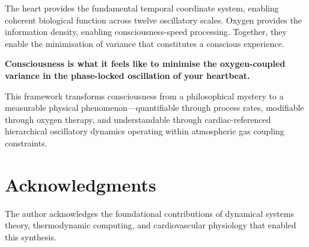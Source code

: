 \documentclass[12pt]{article}
\theoremstyle{remark}
\begin{document}
The heart provides the fundamental temporal coordinate system, enabling coherent biological function across twelve oscillatory scales. Oxygen provides the information density, enabling consciousness-speed processing. Together, they enable the minimisation of variance that constitutes a conscious experience.

\textbf{Consciousness is what it feels like to minimise the oxygen-coupled variance in the phase-locked oscillation of your heartbeat.}

This framework transforms consciousness from a philosophical mystery to a measurable physical phenomenon—quantifiable through process rates, modifiable through oxygen therapy, and understandable through cardiac-referenced hierarchical oscillatory dynamics operating within atmospheric gas coupling constraints.

\section*{Acknowledgments}

The author acknowledges the foundational contributions of dynamical systems theory, thermodynamic computing, and cardiovascular physiology that enabled this synthesis.
\end{document}
